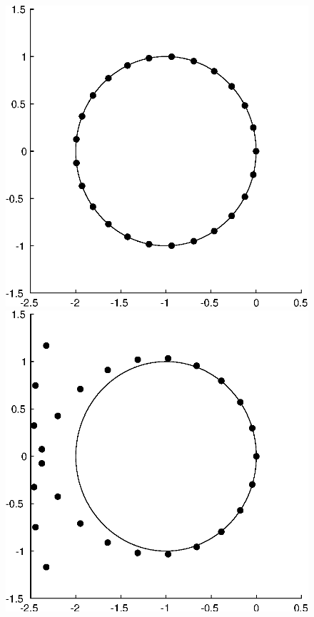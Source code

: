 \documentclass[twocolumn,10pt]{article}
\begin{document}
\begin{figure}[H]
\begin{minipage}[t]{0.48\linewidth}
    \end{minipage}
    \begin{minipage}[t]{0.48\linewidth}
        \centering
        \vspace{.5em}
        \includegraphics[width=0.95\linewidth]{figures/ex_12_82_mu=2.eps}
    \end{minipage}
    \begin{minipage}[t]{0.48\linewidth}
        \centering
        \vspace{.5em}
        \includegraphics[width=0.95\linewidth]{figures/ex_12_82_mu=2.4.eps}
    \end{minipage}
\end{figure} \vspace{-.5em}
\end{document}
